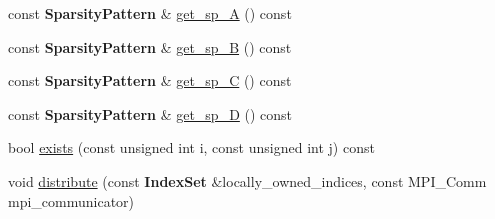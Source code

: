 \begin{DoxyCompactItemize}
\item 
const {\bf Sparsity\+Pattern} \& \hyperlink{class_two_block_sparsity_pattern_a595b3576cc8e02e24a795c9cd639af01}{get\+\_\+sp\+\_\+A} () const 
\item 
const {\bf Sparsity\+Pattern} \& \hyperlink{class_two_block_sparsity_pattern_a36c1dbb12ab6ac24fc30e793e59d2c3b}{get\+\_\+sp\+\_\+B} () const 
\item 
const {\bf Sparsity\+Pattern} \& \hyperlink{class_two_block_sparsity_pattern_a156a0a521faae238543e76aa05a8bad7}{get\+\_\+sp\+\_\+C} () const 
\item 
const {\bf Sparsity\+Pattern} \& \hyperlink{class_two_block_sparsity_pattern_a0990cb1eabe18204dd46ac30e1cc0dda}{get\+\_\+sp\+\_\+D} () const 
\item 
bool \hyperlink{class_two_block_sparsity_pattern_a32bae81b9aec47fa34ddd40c963fb7e8}{exists} (const unsigned int i, const unsigned int j) const 
\item 
void \hyperlink{class_two_block_sparsity_pattern_a61ef6e3f3325cffcfc1d25efc41886b0}{distribute} (const {\bf Index\+Set} \&locally\+\_\+owned\+\_\+indices, const M\+P\+I\+\_\+\+Comm mpi\+\_\+communicator)
\end{DoxyCompactItemize}
